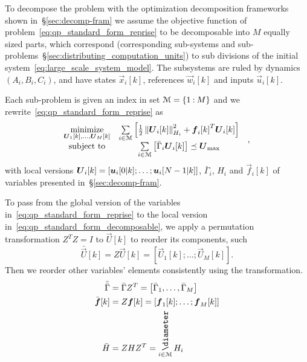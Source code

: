 \documentclass[../main.tex]{subfiles}
\begin{document}
To decompose the problem with the optimization decomposition frameworks shown in~\S\ref{sec:decomp-fram} we assume the objective function of problem~\eqref{eq:qp_standard_form_reprise} to be decomposable into $M$ equally sized parts, which correspond (corresponding sub-systems and sub-problems~\S\ref{sec:distributing_computation_units}) to sub divisions of the initial system~\eqref{eq:large_scale_system_model}.
The subsystems are ruled by dynamics $(A_{i},B_{i},C_{i})$, and have states $\vec{x}_{i}[k]$, references $\vec{w}_{i}[k]$ and inputs $\vec{u}_{i}[k]$.

Each sub-problem is given an index in set $\mathcal{M}=\{1\mathbin{:}M\}$ and we rewrite~\eqref{eq:qp_standard_form_reprise} as
\begin{equation}
  \label{eq:qp_standard_form_decomposable}
  \begin{aligned}
    \begin{matrix}
      \mathop{\textrm{minimize}}\limits_{\boldsymbol{U}_{1}[k],\dots, \boldsymbol{U}_{M}[k]} &
      \sum\limits_{i\in\mathcal{M}}\left[\frac{1}{2}\left\lVert\boldsymbol{U}_{i}[k]\right\rVert^{2}_{H_{i}} + {\boldsymbol{f}_{i}[k]}^{T}\boldsymbol{U}_{i}[k]\right]&\\
      \mathrm{subject~ to} & \sum\limits_{i\in\mathcal{M}}\left[\bar{\Gamma}_{i}\boldsymbol{U}_{i}[k]\right] \preceq {\boldsymbol{U}}_{\text{max}}
    \end{matrix}
  \end{aligned},
\end{equation}
with local versions $\boldsymbol{U}_{i}[k]=\left[\boldsymbol{u}_{i}[0|k]; \dots; \boldsymbol{u}_{i}[N-1|k]\right]$, $\bar{\Gamma}_{i}$, $H_{i}$ and $\vec{f}_{i}[k]$ of variables presented in~\S\ref{sec:decomp-fram}.

\begin{remark}
  To pass from the global version of the variables in~\eqref{eq:qp_standard_form_reprise} to the local version in~\ref{eq:qp_standard_form_decomposable}, we apply a permutation transformation $Z^{T}Z=I$ to $\vec{U}[k]$ to reorder its components, such
  \begin{equation}
    \bar{\vec{U}}[k]=Z\vec{U}[k]=\left[\vec{U}_{1}[k]; \dots; \vec{U}_{M}[k]\right].
  \end{equation}
  Then we reorder other variables' elements consistently using the transformation.
  \begin{align}
    \label{eq:1}
    \bar{\bar{\Gamma}}&=\bar{\Gamma}Z^{T}=\left[\bar{\Gamma}_{1}, \dots, \bar{\Gamma}_{M}\right]\\
    \bar{\vec{f}}[k]&=Z\vec{f}[k]=\left[\vec{f}_{1}[k]; \dots; \vec{f}_{M}[k]\right]\\
    \bar{H}&=ZHZ^{T}=\blkdiag\limits_{i\in\set{M}} H_{i}
  \end{align}
\end{remark}
\end{document}
